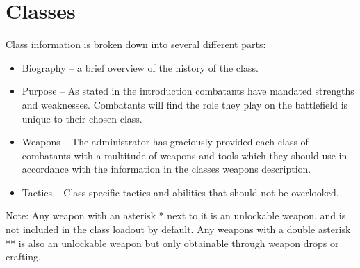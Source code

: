 \section{Classes}

Class information is broken down into several different parts:
\begin{itemize}
	\item Biography – a brief overview of the history of the class.
	\item Purpose – As stated in the introduction combatants have mandated strengths and weaknesses.  Combatants will find the role they play on the battlefield is unique to  their chosen class. 
	\item Weapons – The administrator has graciously provided each class of combatants with a multitude of weapons and tools which they should use in accordance with the information in the classes weapons description. 
	\item Tactics – Class specific tactics and abilities that should not be overlooked.
\end{itemize}
Note: Any weapon with an asterisk * next to it is an unlockable weapon, and is not included in the class loadout by default. Any weapons with a double asterisk ** is also an unlockable weapon but only obtainable through weapon drops or crafting.

\newpage


\newpage


\newpage


\newpage


\newpage



\newpage


\newpage


\newpage


\newpage


